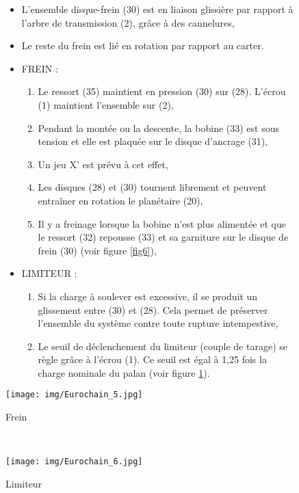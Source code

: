 \newpage

\begin{figure}[!h]
\begin{minipage}{0.48\linewidth}
\begin{itemize}
 \item L'ensemble disque-frein (30) est en liaison glissière par rapport à l'arbre de transmission (2), grâce à des cannelures,
 \item Le reste du frein est lié en rotation  par rapport au carter.
 \item FREIN :
 \begin{enumerate}
  \item Le ressort (35) maintient en pression (30) sur (28). L'écrou (1) maintient l'ensemble sur (2),
 \item Pendant la montée ou la descente, la bobine (33) est sous tension et elle est plaquée sur le disque d'ancrage (31),
 \item Un jeu X' est prévu à cet effet,
 \item Les disques (28) et (30) tournent librement et peuvent entraîner en rotation le planétaire (20),
 \item Il y a freinage lorsque la bobine n'est plus alimentée et que le ressort (32) repousse (33) et sa garniture sur le disque de frein (30) (voir figure \ref{fig6}),
 \end{enumerate}
 \item LIMITEUR :
 \begin{enumerate}
 \item Si la charge à soulever est excessive, il se produit un glissement entre (30) et (28). Cela permet de préserver l'ensemble du système contre toute rupture intempestive,
 \item Le seuil de déclenchement du limiteur (couple de tarage) se règle grâce à l'écrou (1). Ce seuil est égal à 1,25 fois la charge nominale du palan 
(voir figure \ref{fig7}).
 \end{enumerate}
 \end{itemize}
\end{minipage}
 \hfill
\begin{minipage}{0.5\linewidth}
\centering\texttt{[image: img/Eurochain\_5.jpg]}
  \caption{Frein}
 \label{fig6}

 ~\
 
 \centering\texttt{[image: img/Eurochain\_6.jpg]}
 \caption{Limiteur}
 \label{fig7}
\end{minipage}
\end{figure}

